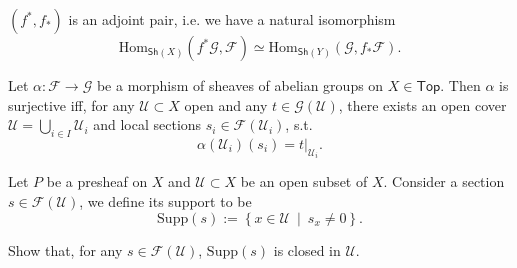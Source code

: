 \documentclass[../Main]{subfiles}
\begin{document}
\begin{prop}
	$\left( f^*, f_* \right)$ is an adjoint pair, i.e. we have a natural isomorphism
	\begin{equation}
		\mathrm{Hom}_{\mathsf{Sh}(X)} \left( f^* \mathcal{G}, \mathcal{F} \right) \simeq
		\mathrm{Hom}_{\mathsf{Sh}(Y)} \left( \mathcal{G}, f_* \mathcal{F} \right)
	.\end{equation} 
\end{prop}

\begin{exr}
	Let $\alpha\colon \mathcal{F} \to \mathcal{G}$ be a morphism
	of sheaves of abelian groups on $X \in \mathsf{Top}$.
	Then $\alpha$ is surjective iff,
	for any $\mathcal{U} \subset X$ open and any $t \in \mathcal{G}(\mathcal{U})$, 
	there exists an open cover $\mathcal{U} = \bigcup_{i \in I} \mathcal{U}_i$ and
	local sections $s_i \in \mathcal{F}(\mathcal{U}_i)$, s.t.
	\begin{equation}
		\alpha(\mathcal{U}_i)(s_i) = \left.t\right|_{\mathcal{U}_i} 
	.\end{equation} 
\end{exr} 

\begin{defn}
	Let $P$ be a presheaf on $X$ and $\mathcal{U} \subset X$ be an open subset of $X$.
	Consider a section $s \in \mathcal{F}(\mathcal{U})$, we define its support to be
	\begin{equation}
		\mathrm{Supp}(s) := \left\{ x \in \mathcal{U} \ \middle|\ s_x \neq 0 \right\}
	.\end{equation} 
\end{defn}

\begin{exr}
	Show that, for any $s \in \mathcal{F}(\mathcal{U})$, $\mathrm{Supp} (s)$ is closed in $\mathcal{U}$.
\end{exr} 
\end{document}
